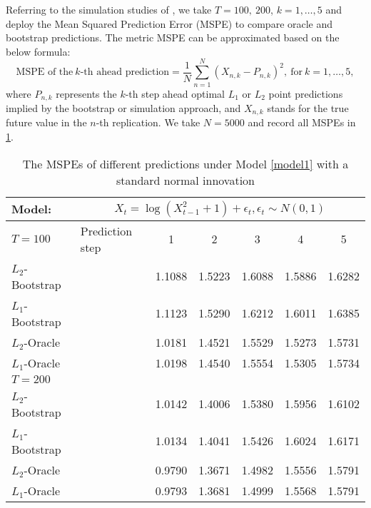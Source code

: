 \documentclass[a4paper]{article}
\begin{document}
Referring to the simulation studies of \cite{pan2016bootstrap}, we take $T=100,~200$, $k=1,\ldots,5$ and deploy the Mean Squared Prediction Error (MSPE) to compare oracle and bootstrap predictions. The metric MSPE can be approximated based on the below formula:
\begin{equation}
    \text{MSPE of the}~k \text{-th ahead prediction} = \frac{1}{N}\sum_{n=1}^{N}(X_{n,k} - P_{n,k})^2,~\text{for}~k=1,\ldots,5,
\end{equation}
where $P_{n,k}$ represents the $k$-th step ahead optimal $L_1$ or $L_2$ point predictions implied by the bootstrap or simulation approach, and $X_{n,k}$ stands for the true future value in the $n$-th replication. We take $N = 5000$ and record all MSPEs in \cref{Tablogx2add1_point}.
\begin{table}[htbp]
\centering
  \caption{The MSPEs of different predictions under Model \cref{model1} with a standard normal innovation}
  \vspace{2pt}
  \label{Tablogx2add1_point}
\begin{tabular}{llccccc}
  \toprule 
 Model: & \multicolumn{6}{c}{$X_t = \log(X_{t-1}^2 + 1) + \epsilon_t, \epsilon_t\sim N(0,1)$} \\
 \midrule
    $T = 100$ & Prediction step & 1     & 2     & 3     & 4     & 5 \\[3pt]
    $L_2$-Bootstrap &     & 1.1088 & 1.5223 & 1.6088 & 1.5886 & 1.6282 \\
    $L_1$-Bootstrap &    & 1.1123 & 1.5290 & 1.6212 & 1.6011 & 1.6385 \\
    $L_2$-Oracle &  & 1.0181 & 1.4521 & 1.5529 & 1.5273 & 1.5731 \\
    $L_1$-Oracle &   & 1.0198 & 1.4540 & 1.5554 & 1.5305 & 1.5734 \\[3pt]
    $T = 200$ &       &       &       &       &       &  \\[3pt]
    $L_2$-Bootstrap &     & 1.0142 & 1.4006 & 1.5380 & 1.5956 & 1.6102\\
    $L_1$-Bootstrap &    & 1.0134 & 1.4041 & 1.5426 & 1.6024 & 1.6171  \\
    $L_2$-Oracle &  & 0.9790 & 1.3671 & 1.4982 & 1.5556 & 1.5791 \\
    $L_1$-Oracle &   & 0.9793 & 1.3681 & 1.4999 & 1.5568 & 1.5791 \\
       \bottomrule
    \end{tabular}\\
\end{table}
\end{document}

